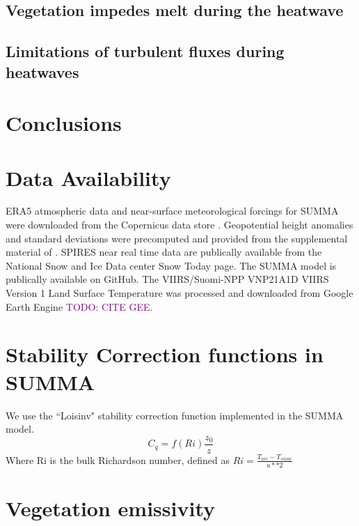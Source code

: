 \documentclass[12pt]{iopjournal}
\newcommand{\comment}[1]{\textcolor{purple}{TODO: #1}}      %
\begin{document}
\subsection{Vegetation impedes melt during the heatwave}


\subsection{Limitations of turbulent fluxes during heatwaves}


\section{Conclusions}

\section{Data Availability}
ERA5 atmospheric data and near-surface meteorological forcings for SUMMA were downloaded from the Copernicus data store \cite{cdsapi}.
Geopotential height anomalies and standard deviations were precomputed and provided from the supplemental material of \cite{Lee2023-cc}.
SPIRES near real time data are publically available from the National Snow and Ice Data center Snow Today page. 
The SUMMA model is publically available on GitHub.
The VIIRS/Suomi-NPP VNP21A1D VIIRS Version 1 Land Surface Temperature was processed and downloaded from Google Earth Engine \comment{CITE GEE}.


\appendix
\section{Stability Correction functions in SUMMA}
We use the ``Loisinv" stability correction function implemented in the SUMMA model. 
\begin{equation}
C_q = f(Ri) \frac{z_0}{z}
\end{equation}
Where Ri is the bulk Richardson number, defined as $Ri = \frac{T_{air} - T_{snow}}{u**2}$


\section{Vegetation emissivity}

\clearpage
\end{document}
